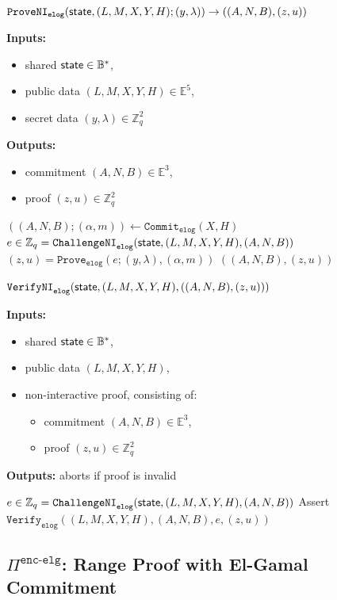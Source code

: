 \documentclass[11pt]{article}
\newenvironment{inlineAlgorithm}{}{}
\newcommand{\algoName}[1]{#1 \par}
\newcommand{\algoInputsList}[1]{
    {\small \bf Inputs:} 
        \begin{itemize}[noitemsep,topsep=0pt]
            #1
        \end{itemize}
}
\newcommand{\algoOutputs}[1]{
    {\small \bf Outputs:} #1 \par
}
\newcommand{\algoOutputsList}[1]{
    {\small \bf Outputs:}
        \begin{itemize}[noitemsep,topsep=0pt]
            #1
        \end{itemize}
}
\def\state{{\sf state}}
\newcommand{\proof}[1]{\ensuremath{\Pi^{\mathtt{#1}}}}
\newcommand{\commit}[1]{\ensuremath{\mathtt{Commit}_{\mathtt{#1}}}}
\newcommand{\challengeni}[1]{\ensuremath{\mathtt{ChallengeNI}_{\mathtt{#1}}}}
\newcommand{\prove}[1]{\ensuremath{\mathtt{Prove}_{\mathtt{#1}}}}
\newcommand{\proveni}[1]{\ensuremath{\mathtt{ProveNI}_{\mathtt{#1}}}}
\newcommand{\verify}[1]{\ensuremath{\mathtt{Verify}_{\mathtt{#1}}}}
\newcommand{\verifyni}[1]{\ensuremath{\mathtt{VerifyNI}_{\mathtt{#1}}}}
\newcommand{\E}{\mathbb{E}}
\newcommand{\Z}{\mathbb{Z}}
\newcommand{\?}[1]{\stackrel{?}{#1}}
\newcommand{\Byte}{\ensuremath{\mathbb{B}}}
\begin{document}
\begin{description}

\item
\begin{inlineAlgorithm}
\algoName{$\proveni{elog}(\state, (L, M, X, Y, H); (y, \lambda)) \to (
    (A, N, B),
    (z, u)
)$}
\algoInputsList{
    \item shared $\state \in \Byte^*$,
    \item public data $(L, M, X, Y, H) \in \E^5$,
    \item secret data $(y, \lambda) \in \Z_q^2$
}
\algoOutputsList{
    \item commitment $(A, N, B) \in \E^3$,
    \item proof $(z, u) \in \Z_q^2$
}
\begin{algorithmic}[1]
\State $((A, N, B); (\alpha, m)) \gets \commit{elog}(X, H)$
\State $e \in \Z_q = \challengeni{elog}(\state, (L, M, X, Y, H), (A, N, B))$
\State $(z, u) = \prove{elog}(e; (y, \lambda), (\alpha, m))$
\State \Return $((A, N, B), (z, u))$
\end{algorithmic}
\end{inlineAlgorithm}

\item
\begin{inlineAlgorithm}
\algoName{$\verifyni{elog}(\state, (L, M, X, Y, H), ((A, N, B), (z, u)))$}
\algoInputsList{
    \item shared $\state \in \Byte^*$,
    \item public data $(L, M, X, Y, H)$,
    \item non-interactive proof, consisting of:
        \begin{itemize}
        \item commitment $(A, N, B) \in \E^3$,
        \item proof $(z, u) \in \Z_q^2$
        \end{itemize}
}
\algoOutputs{aborts if proof is invalid}
\begin{algorithmic}[1]
\State $e \in \Z_q = \challengeni{elog}(\state, (L, M, X, Y, H), (A, N, B))$
\State Assert $\verify{elog}((L, M, X, Y, H), (A, N, B), e, (z, u))$
\end{algorithmic}
\end{inlineAlgorithm}

\end{description}

\subsection{$\proof{enc\mbox{-}elg}$: Range Proof with El-Gamal Commitment}
\end{document}

